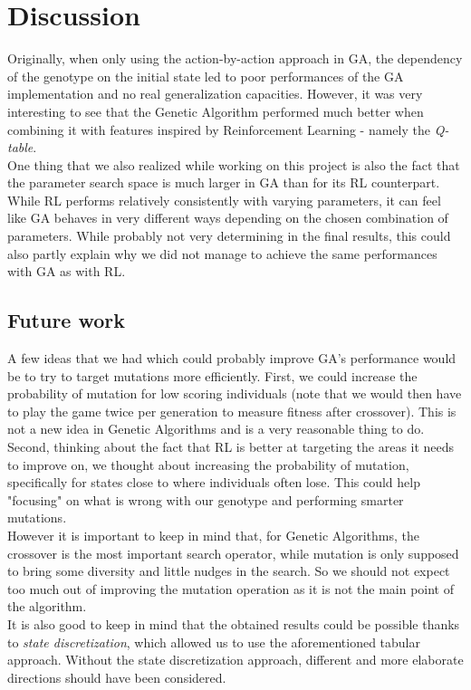 \section{Discussion}
Originally, when only using the action-by-action approach in GA, the dependency of the genotype on the initial state led to poor performances of the GA implementation and no real generalization capacities.
However, it was very interesting to see that the Genetic Algorithm performed much better when combining it with features inspired by Reinforcement Learning - namely the \textit{Q-table}.
\\
One thing that we also realized while working on this project is also the fact that the parameter search space is much larger in GA than for its RL counterpart. 
While RL performs relatively consistently with varying parameters, it can feel like GA behaves in very different ways depending on the chosen combination of parameters.
While probably not very determining in the final results, this could also partly explain why we did not manage to achieve the same performances with GA as with RL.
\\

\subsection{Future work}
A few ideas that we had which could probably improve GA's performance would be to try to target mutations more efficiently.
First, we could increase the probability of mutation for low scoring individuals (note that we would then have to play the game twice per generation to measure fitness after crossover).
This is not a new idea in Genetic Algorithms and is a very reasonable thing to do.
\\
Second, thinking about the fact that RL is better at targeting the areas it needs to improve on, we thought about increasing the probability of mutation, specifically for states close to where individuals often lose.
This could help "focusing" on what is wrong with our genotype and performing smarter mutations.
\\
However it is important to keep in mind that, for Genetic Algorithms, the crossover is the most important search operator, while mutation is only supposed to bring some diversity and little nudges in the search.
So we should not expect too much out of improving the mutation operation as it is not the main point of the algorithm.
\\
It is also good to keep in mind that the obtained results could be possible thanks to \textit{state discretization}, which allowed us to use the aforementioned tabular approach.
Without the state discretization approach, different and more elaborate directions should have been considered. 

